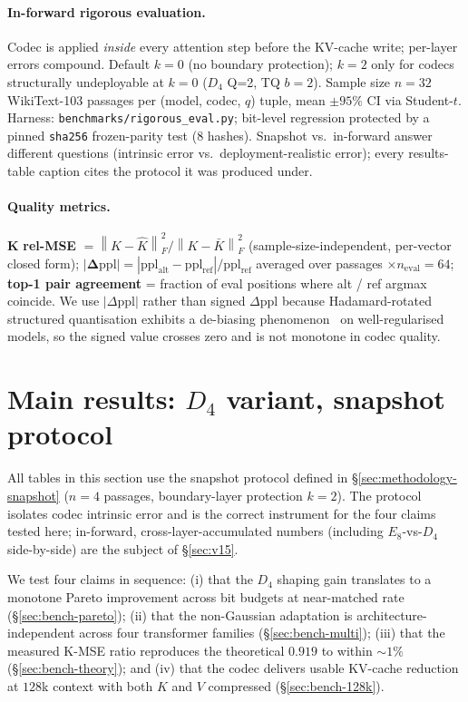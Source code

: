 \documentclass[10pt,a4paper]{article}
\theoremstyle{definition}
\theoremstyle{plain}
\newcommand{\norm}[1]{\left\lVert#1\right\rVert}
\begin{document}
\paragraph{In-forward rigorous evaluation.}
\label{sec:methodology-rigorous}
Codec is applied \emph{inside} every attention step before the
KV-cache write; per-layer errors compound. Default $k=0$ (no
boundary protection); $k=2$ only for codecs structurally
undeployable at $k=0$ ($D_4$ Q=2, TQ $b=2$). Sample size $n = 32$
WikiText-103 passages per (model, codec, $q$) tuple, mean
$\pm 95\%$ CI via Student-$t$. Harness:
\texttt{benchmarks/rigorous\_eval.py}; bit-level regression
protected by a pinned \texttt{sha256} frozen-parity test
(8 hashes). Snapshot vs.\ in-forward answer different questions
(intrinsic error vs.\ deployment-realistic error); every
results-table caption cites the protocol it was produced under.

\paragraph{Quality metrics.}
$\boldsymbol{K}$ \textbf{rel-MSE} $=\!\norm{K-\hat K}_F^2/\norm{K-\bar K}_F^2$
(sample-size-independent, per-vector closed form);
$\boldsymbol{|\Delta\mathrm{ppl}|}
= |\mathrm{ppl}_\mathrm{alt}-\mathrm{ppl}_\mathrm{ref}|
/\mathrm{ppl}_\mathrm{ref}$ averaged over
passages $\times n_\mathrm{eval}=64$; \textbf{top-1 pair
agreement} = fraction of eval positions where alt / ref argmax
coincide. We use $|\Delta\mathrm{ppl}|$ rather than signed
$\Delta\mathrm{ppl}$ because Hadamard-rotated structured
quantisation exhibits a de-biasing
phenomenon~\cite{quip-sharp} on well-regularised models, so the
signed value crosses zero and is not monotone in codec quality.

\section{Main results: $D_4$ variant, snapshot protocol}
\label{sec:benchmarks}

All tables in this section use the snapshot protocol defined in
\S\ref{sec:methodology-snapshot} ($n=4$ passages, boundary-layer
protection $k=2$). The protocol isolates codec intrinsic error and
is the correct instrument for the four claims tested here;
in-forward, cross-layer-accumulated numbers (including
$E_8$-vs-$D_4$ side-by-side) are the subject of
\S\ref{sec:v15}.

We test four claims in sequence: (i) that the $D_4$ shaping gain
translates to a monotone Pareto improvement across bit budgets at
near-matched rate (\S\ref{sec:bench-pareto}); (ii) that the
non-Gaussian adaptation is architecture-independent across four
transformer families (\S\ref{sec:bench-multi}); (iii) that the
measured K-MSE ratio reproduces the theoretical $0.919$ to within
$\sim\!1\%$ (\S\ref{sec:bench-theory}); and (iv) that the codec
delivers usable KV-cache reduction at $128$k context with both
$K$ and $V$ compressed (\S\ref{sec:bench-128k}).
\end{document}
